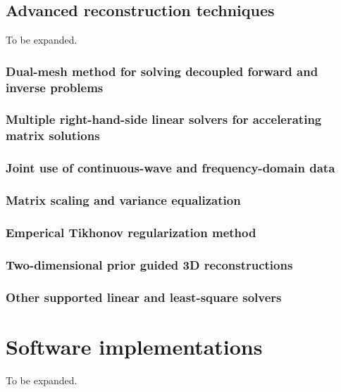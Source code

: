 \documentclass[12pt]{book}               %
\begin{document}
\section{Advanced reconstruction techniques}

To be expanded.

\subsection{Dual-mesh method for solving decoupled forward and inverse problems}

\subsection{Multiple right-hand-side linear solvers for accelerating matrix solutions}

\subsection{Joint use of continuous-wave and frequency-domain data}

\subsection{Matrix scaling and variance equalization}

\subsection{Emperical Tikhonov regularization method}

\subsection{Two-dimensional prior guided 3D reconstructions}

\subsection{Other supported linear and least-square solvers}

\chapter{Software implementations}

To be expanded.

\clearpage



\end{document}
